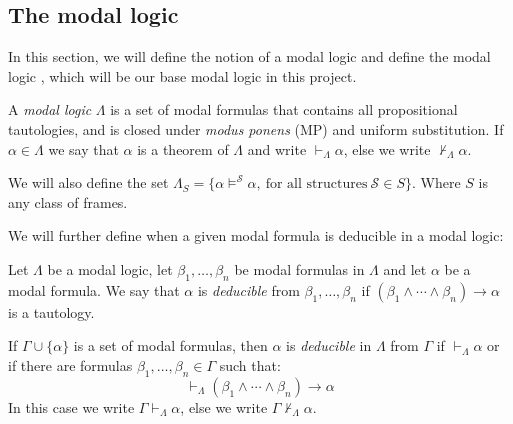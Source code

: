 \documentclass[../main.tex]{subfiles}
\begin{document}
\subsection{The modal logic \GL}
In this section, we will define the notion of a modal logic and define the modal
logic \GL, which will be our base modal logic in this project.
\begin{defi}
	A \textit{modal logic} $\Lambda$ is a set of modal formulas that contains all
	propositional tautologies, and is closed under \textit{modus ponens}
	(MP) and uniform substitution. If $\alpha\in\Lambda$ we say that
	$\alpha$ is a theorem of $\Lambda$ and write $\vdash_\Lambda\alpha$,
	else we write $\not\vdash_\Lambda\alpha$.

	We will also define the set
	$\Lambda_S=\{\alpha\vDash^\mathcal{S}\alpha,\ \text{for all structures}\
	\mathcal{S}\in S\}$. Where $S$ is any class of frames.
\end{defi}
We will further define when a given modal formula is deducible in a modal
logic:
\begin{defi}
	Let $\Lambda$ be a modal logic, let $\beta_1,\ldots,\beta_n$
	be modal formulas in $\Lambda$ and let $\alpha$ be a modal formula. We say that
	$\alpha$ is \textit{deducible} from $\beta_1,\ldots,\beta_n$ if
	$(\beta_1\wedge\cdots\wedge\beta_n)\rightarrow\alpha$ is a tautology.

	If $\Gamma\cup\{\alpha\}$ is a set of modal formulas, then $\alpha$ is
	\textit{deducible} in $\Lambda$ from $\Gamma$ if $\vdash_\Lambda\alpha$ or if
	there are formulas $\beta_1,\ldots,\beta_n\in\Gamma$ such that:
	\[\vdash_\Lambda(\beta_1\wedge\cdots\wedge\beta_n)\rightarrow\alpha\]
	In this case we write $\Gamma\vdash_\Lambda\alpha$, else we write
	$\Gamma\not\vdash_\Lambda\alpha$.
\end{defi}
\end{document}

